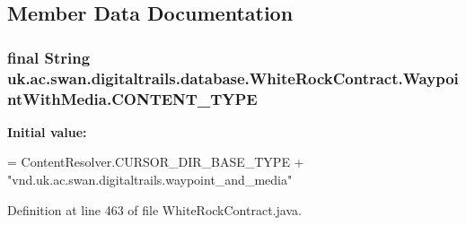 \subsection{Member Data Documentation}
\hypertarget{classuk_1_1ac_1_1swan_1_1digitaltrails_1_1database_1_1_white_rock_contract_1_1_waypoint_with_media_a399e1b8c04a04ef4fcbe4598c701a199}{
\subsubsection[{C\+O\+N\+T\+E\+N\+T\+\_\+\+T\+Y\+P\+E}]{\setlength{\rightskip}{0pt plus 5cm}final String uk.\+ac.\+swan.\+digitaltrails.\+database.\+White\+Rock\+Contract.\+Waypoint\+With\+Media.\+C\+O\+N\+T\+E\+N\+T\+\_\+\+T\+Y\+P\+E\hspace{0.3cm}{\ttfamily [static]}}}\label{classuk_1_1ac_1_1swan_1_1digitaltrails_1_1database_1_1_white_rock_contract_1_1_waypoint_with_media_a399e1b8c04a04ef4fcbe4598c701a199}
{\bfseries Initial value\+:}
\begin{DoxyCode}
= ContentResolver.CURSOR\_DIR\_BASE\_TYPE +
                \textcolor{stringliteral}{"vnd.uk.ac.swan.digitaltrails.waypoint\_and\_media"}
\end{DoxyCode}


Definition at line 463 of file White\+Rock\+Contract.\+java.

